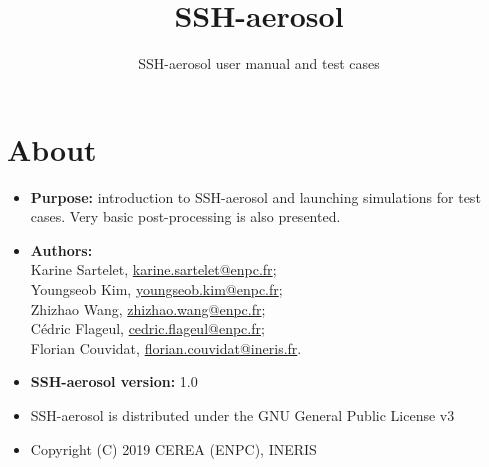 \documentclass[a4paper,11pt]{article}
\title{SSH-aerosol}
\date{}
\author{SSH-aerosol user manual and test cases}
\begin{document}
\maketitle

\section*{About}

\begin{itemize}
\item[] {\bf Purpose:} introduction to SSH-aerosol and launching simulations
  for test cases. Very basic post-processing is also
  presented. 
\item[] {\bf Authors:} \\Karine Sartelet, \url{karine.sartelet@enpc.fr};\\
  Youngseob Kim, \url{youngseob.kim@enpc.fr};\\ Zhizhao Wang,
  \url{zhizhao.wang@enpc.fr};\\ C\'edric Flageul,
  \url{cedric.flageul@enpc.fr}; \\Florian Couvidat, \url{florian.couvidat@ineris.fr}.
\item[] {\bf SSH-aerosol version:} 1.0
\item[] SSH-aerosol is distributed under the GNU General Public License v3
\item[] Copyright (C) 2019 CEREA (ENPC), INERIS
\end{itemize}

\tableofcontents

\newpage
\end{document}
